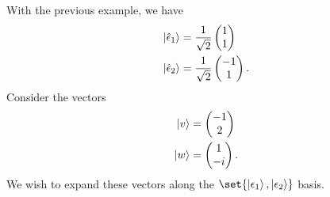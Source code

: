 \documentclass[10pt]{mypackage}
\begin{document}
\begin{example}
With the previous example, we have
\begin{align*}
  \ket{\hat{\epsilon}_1} &= \frac{1}{\sqrt{2}}\begin{pmatrix}1\\1\end{pmatrix}\\
  \ket{\hat{\epsilon}_2} &= \frac{1}{\sqrt{2}} \begin{pmatrix}-1\\1\end{pmatrix}.
\end{align*}
Consider the vectors
\begin{align*}
  \ket{v} &= \begin{pmatrix}-1\\2\end{pmatrix}\\
  \ket{w} &= \begin{pmatrix}1\\-i\end{pmatrix}.
\end{align*}
We wish to expand these vectors along the $\set{\ket{\epsilon_1},\ket{\epsilon_2}}$ basis.\newline


\end{example}
\end{document}
